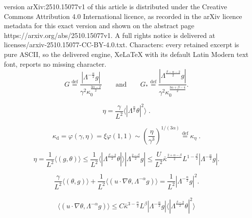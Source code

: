 \documentclass[10pt,a4paper]{amsart}
\newcommand{\ga}{\gamma}
\newcommand{\kapd}{\kap_{\textrm{d}}}
\newcommand{\kap}{\kappa}
\newcommand{\ka}{\kappa}
\newcommand{\la}{\Lambda}
\newcommand{\te}{\theta}
\begin{document}
version arXiv:2510.15077v1 of this article is distributed under the Creative Commons Attribution 4.0 International licence, as recorded in the arXiv licence metadata for this exact version and shown on the abstract page https://arxiv.org/abs/2510.15077v1. A full rights notice is delivered at licenses/arxiv-2510.15077-CC-BY-4.0.txt. Characters: every retained excerpt is pure ASCII, so the delivered engine, XeLaTeX with its default Latin Modern text font, reports no missing character.
    \begin{equation} \label{def:G}
        G \overset{\text{def}}{=} \frac{|\la^{-\frac{\alpha}{2}}g|}{\ga^2 \kappa_0^{\frac{3\alpha-2}{2}}} \qquad \text{and} \qquad G_* \overset{\text{def}}{=} \frac{|\la^{\frac{\beta-\alpha-2}{2}}g|}{\ga^2 \kappa_0^{\frac{3\alpha+\beta-4}{2}}} .
    \end{equation}

\begin{equation} \label{def:eta}
    \eta = \frac{\ga}{L^2} \langle|\la^{\frac{\alpha}{2}} \te|^2\rangle \;.
\end{equation}

\begin{equation} \label{def:keta}
    {\kapd} = \varphi(\ga,\eta) = \xi \varphi(1,1) \sim \left(\frac{\eta}{\ga^3} \right)^{1/(3\alpha)} \overset{\text{def}}{=} \ka_\eta \;.
\end{equation}

    \begin{equation} \label{ineq:etaineq}
        \eta = \frac{1}{L^2} \langle (g, \te) \rangle \le \frac{1}{L^2} \langle|\la^{\frac{\beta-2}{2}}\te|\rangle |\la^{\frac{2-\beta}{2}}g| 
        \le \frac{U}{L^2} \bar{\ka}^{\frac{2+\alpha-\beta}{2}}{L^{1-\frac{\beta}{2}}} |\la^{-\frac{\alpha}{2}}g| .
    \end{equation}

    \begin{equation} \label{eq:eq1_la_nalpha_g}
        \frac{\ga}{L^2} \langle (\te,g) \rangle + \frac{1}{L^2}\langle (u\cdotp\nabla \te, \la^{-\alpha}g) \rangle  = \frac{1}{L^2} |\la^{-\frac{\alpha}{2}} g|^2  .
    \end{equation}

\begin{align} \label{ineq:bterm}
 \langle (u\cdotp\nabla \te, \la^{-\alpha}g) \rangle \le  C \bar{\ka}^{3-\frac{\alpha}{2}}{L^{\beta}} |\la^{-\frac{\alpha}{2}}g| \langle |\la^{\frac{\beta-2}{2}}\te|^2 \rangle 
\end{align}
\end{document}
